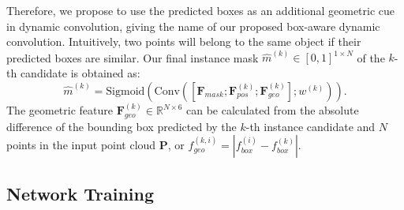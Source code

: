 \documentclass[10pt,twocolumn,letterpaper]{article}
\begin{document}
Therefore, we propose to use the predicted boxes as an additional geometric cue in dynamic convolution, giving the name of our proposed box-aware dynamic convolution. Intuitively, two points will belong to the same object if their predicted boxes are similar. 
% 
Our final instance mask $\widehat{m}^{(k)} \in [0,1]^{1 \times N}$ of the $k$-th candidate is obtained as:
\begin{equation}
    \widehat{m}^{(k)} = \text{Sigmoid}\left(\text{Conv} \left( \left[\mathbf{F}_{mask}; \mathbf{F}_{pos}^{(k)};\mathbf{F}_{geo}^{(k)}\right]; w^{(k)} \right)\right).
\end{equation}
The geometric feature $\mathbf{F}_{geo}^{(k)} \in \mathbb{R}^{N \times 6}$ can be calculated from the absolute difference of the bounding box predicted by the $k$-th instance candidate and $N$ points in the input point cloud $\mathbf{P}$, or $f_{geo}^{(k,i)} = \left | f_{box}^{(i)}-f_{box}^{(k)} \right |$.




\subsection{Network Training}
\label{sec:loss}
\end{document}
